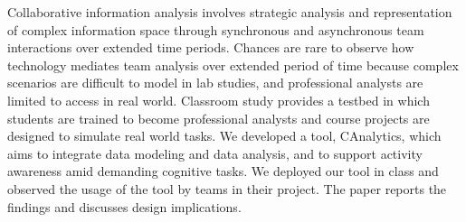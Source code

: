 
Collaborative information analysis involves strategic analysis and representation of complex information space through synchronous and asynchronous team interactions over extended time periods. Chances are rare to observe how technology mediates team analysis over extended period of time because complex scenarios are difficult to model in lab studies, and professional analysts are limited to access in real world. Classroom study provides a testbed in which students are trained to become professional analysts and course projects are designed to simulate real world tasks. We developed a tool, CAnalytics, which aims to integrate data modeling and data analysis, and to support activity awareness amid demanding cognitive tasks. We deployed our tool in class and observed the usage of the tool by teams in their project. The paper reports the findings and discusses design implications.
%
